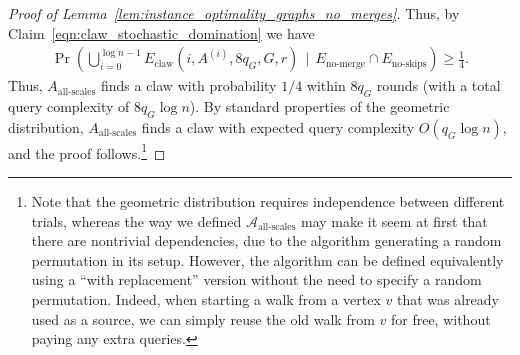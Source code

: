 \documentclass[11pt]{article}
\numberwithin{equation}{section}
\newcommand{\1}{\mathbf{1}}
\newcommand{\A}{\mathcal A}
\begin{document}
\begin{proof}[Proof of Lemma~\ref{lem:instance_optimality_graphs_no_merges}]
Thus, by Claim~\ref{eqn:claw_stochastic_domination} we have
\begin{align*}
\Pr\left(\bigcup_{i=0}^{\log n - 1} E_{\text{claw}}(i,A^{(i)}, 8q_G, G,  r) \ \ |\ \  E_{\text{no-merge}} \cap E_{\text{no-skips}}\right) \geq \frac{1}{4}.
\end{align*}
Thus, $A_{\text{all-scales}}$ finds a claw with probability $1/4$ within $8q_G$ rounds (with a total query complexity of $8q_G \log n$). By standard properties of the geometric distribution, $A_{\text{all-scales}}$ finds a claw with expected query complexity $O(q_G \log n)$, and the proof follows.\footnote{Note that the geometric distribution requires independence between different trials, whereas the way we defined $\A_{\text{all-scales}}$ may make it seem at first that there are nontrivial dependencies, due to the algorithm generating a random permutation in its setup. However, the algorithm can be defined equivalently using a ``with replacement'' version without the need to specify a random permutation. Indeed, when starting a walk from a vertex $v$ that was already used as a source, we can simply reuse the old walk from $v$ for free, without paying any extra queries.}
\iffalse
\sum_{i=0}^{\log n - 1} p_i &\geq 
\sum_{i=0}^{\log n - 1} \Pr(E_{\text{claw}}(i,A, G, 2q_G, r) | E_{\text{no-merge}} \cap E_{\text{no-skips}})\\
&\geq \Pr\left(\bigcup_{i=0}^{\log n - 1} E_{\text{claw}}(i,A, G, 2q_G, r) | E_{\text{no-merge}} \cap E_{\text{no-skips}}\right) \geq \frac{1}{4}.
\end{align*}

\sum_{i=0}^{\log n - 1}\Pr\left(E_i(G, 2q_G, A) \right) \geq
\Pr\left(\bigcup_{i=0}^{\log n-1} E_i(G, 2q_G, A) \right) \geq \frac{1}{2}.
\end{equation}
We next apply Claim~\ref{claim:optimality_of_Ai} to conclude that $\Pr(E_i(G, 2q_G, A)) \leq \Pr(E_i(G, 8q_G, A^{(i)}) + o(1/\log n)$. Summing over all $i$ and combining with \eqref{eqn:events_walk_claw}, we have
$$
\sum_{i=0}^{\log n} \Pr(E_i(G, 8q_G, A^{(i)})) \geq \frac{1}{2} - o(1).
$$
Define $p_i = \Pr(E_i(G, 8q_G, A^{(i)})$ and note that, because the copies $A^{(0)},\ldots, A^{(\log n - 1)}$ use independent randomness, the probability they all fail in finding a claw within the first $8q_G$ iterations is bounded by 
$$
\Pi_{i=0}^{\log n - 1} (1-p_i) \leq e^{-\sum_{i=0}^{\log n - 1} p_i} = e^{-\frac{1}{2}+o(1)} = \Theta(1).
$$
Note that the query complexity of each iteration is $O(\log n)$.
By standard properties of the geometric distribution, the expected number of iterations required for success is $O(q_G)$, and thus the expected query complexity is $O(q_G \log n)$.
\fi
\end{proof}
\end{document}
